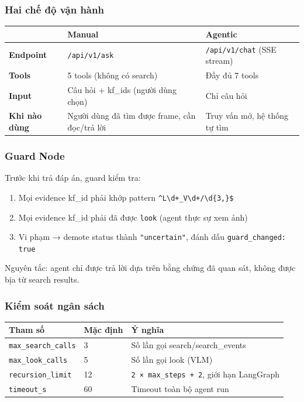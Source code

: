 \documentclass[12pt,a4paper,onecolumn]{article}
\begin{document}
\subsubsection{Hai chế độ vận hành}

\begin{center}
\begin{tabular}{l l l}
\toprule
 & \textbf{Manual} & \textbf{Agentic} \\
\midrule
\textbf{Endpoint} & \texttt{/api/v1/ask} & \texttt{/api/v1/chat} (SSE stream) \\
\textbf{Tools} & 5 tools (không có search) & Đầy đủ 7 tools \\
\textbf{Input} & Câu hỏi + kf\_ids (người dùng chọn) & Chỉ câu hỏi \\
\textbf{Khi nào dùng} & Người dùng đã tìm được frame, cần đọc/trả lời & Truy vấn mở, hệ thống tự tìm \\
\bottomrule
\end{tabular}
\end{center}


\subsubsection{Guard Node}

Trước khi trả đáp án, guard kiểm tra:

\begin{enumerate}
  \item Mọi evidence kf\_id phải khớp pattern \texttt{\textasciicircum{}L\textbackslash{}d+\_V\textbackslash{}d+/\textbackslash{}d\{3,\}\$}
  \item Mọi evidence kf\_id phải đã được \texttt{look} (agent thực sự xem ảnh)
  \item Vi phạm → demote status thành \texttt{"uncertain"}, đánh dấu \texttt{guard\_changed: true}
\end{enumerate}


Nguyên tắc: agent chỉ được trả lời dựa trên bằng chứng đã quan sát, không được bịa từ search results.

\subsubsection{Kiểm soát ngân sách}

\begin{center}
\begin{tabular}{l l l}
\toprule
Tham số & Mặc định & Ý nghĩa \\
\midrule
\texttt{max\_search\_calls} & 3 & Số lần gọi search/search\_events \\
\texttt{max\_look\_calls} & 5 & Số lần gọi look (VLM) \\
\texttt{recursion\_limit} & 12 & \texttt{2 × max\_steps + 2}, giới hạn LangGraph \\
\texttt{timeout\_s} & 60 & Timeout toàn bộ agent run \\
\bottomrule
\end{tabular}
\end{center}
\end{document}
